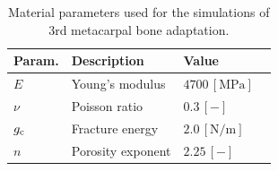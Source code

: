 \documentclass[onecolumn]{svjour3}
\begin{document}
\begin{table}[h]
	\centering
	\begin{tabular}{lll}
		\hline
		 Param.             & Description                  & Value  \\ \hline
		$E  $                 & Young's modulus              & $4700 \,\mathrm{ [MPa]}$ ~\cite{Les1994} \\
		$\nu  $               & Poisson ratio                & $0.3 \,\mathrm{ [-]}$ \\
		$g_{\text c}$					&	Fracture energy							 &  $2.0\,[\mathrm{ N/m}]$ \\
		$n$                   & Porosity exponent            & $2.25 \,\mathrm{ [-]}$     ~\cite{Les1994}   \\ 
		\hline
	\end{tabular} 
	\caption{Material parameters used for the simulations of 3rd metacarpal bone adaptation.}
	\label{tab:parameters_mc3}
\end{table}
% 
% 
\end{document}
